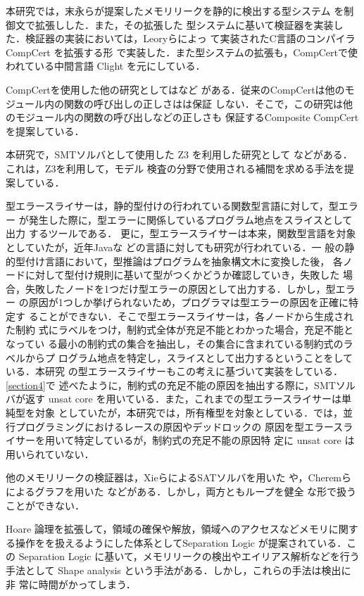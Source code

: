 本研究では，末永らが提案したメモリリークを静的に検出する型システム
\cite{DBLP:conf/aplas/SuenagaK09}を制御文で拡張しした．また，その拡張した
型システムに基いて検証器を実装した．検証器の実装においては，Leoryらによっ
て実装されたC言語のコンパイラCompCert
\cite{DBLP:journals/cacm/Leroy09,DBLP:conf/itp/KrebbersLW14 }を拡張する形
で実装した．また型システムの拡張も，CompCertで使われている中間言語
Clight \cite{DBLP:journals/jar/BlazyL09} を元にしている．

CompCertを使用した他の研究としては\cite{DBLP:conf/popl/StewartBCA15}など
がある．従来のCompCertは他のモジュール内の関数の呼び出しの正しさはは保証
しない．そこで，この研究は他のモジュール内の関数の呼び出しなどの正しさも
保証するComposite CompCertを提案している．

本研究で，SMTソルバとして使用した Z3 を利用した研究として
\cite{DBLP:conf/fmcad/McMillan11}などがある．これは，Z3を利用して，モデル
検査の分野で使用される補間を求める手法を提案している．

型エラースライサーは，静的型付けの行われている関数型言語に対して，型エラー
が発生した際に，型エラーに関係しているプログラム地点をスライスとして出力
するツールである\cite{DBLP:conf/esop/HaackW03,DBLP:conf/dsl/DineshT97}．
更に，型エラースライサーは本来，関数型言語を対象としていたが，近年Javaな
どの言語に対しても研究が行われている\cite{DBLP:conf/pepm/BoustaniH09}．一
般の静的型付け言語において，型推論はプログラムを抽象構文木に変換した後，
各ノードに対して型付け規則に基いて型がつくかどうか確認していき，失敗した
場合，失敗したノードを1つだけ型エラーの原因として出力する．しかし，型エラー
の原因が1つしか挙げられないため，プログラマは型エラーの原因を正確に特定す
ることができない．そこで型エラースライサーは，各ノードから生成された制約
式にラベルをつけ，制約式全体が充足不能とわかった場合，充足不能となってい
る最小の制約式の集合を抽出し，その集合に含まれている制約式のラベルからプ
ログラム地点を特定し，スライスとして出力するということをしている．本研究
の型エラースライサーもこの考えに基づいて実装をしている．\ref{section4}で
述べたように，制約式の充足不能の原因を抽出する際に，SMTソルバが返す
unsat core を用いている．また，これまでの型エラースライサーは単純型を対象
としていたが，本研究では，所有権型を対象としている．\cite{飯村枝里2007,
飯村枝里2008}では，並行プログラミングにおけるレースの原因やデッドロックの
原因を型エラースライサーを用いて特定しているが，制約式の充足不能の原因特
定に unsat core は用いられていない．

他のメモリリークの検証器は，XieらによるSATソルバを用いた
\cite{DBLP:conf/sigsoft/XieA05}や，Cheremらによるグラフを用いた
\cite{DBLP:conf/pldi/CheremPR07}などがある．しかし，両方ともループを健全
な形で扱うことができない．

Hoare 論理を拡張して，領域の確保や解放，領域へのアクセスなどメモリに関す
る操作をを扱えるようにした体系としてSeparation Logic
\cite{DBLP:conf/lics/Reynolds02}が提案されている．この Separation Logic
に基いて，メモリリークの検出やエイリアス解析などを行う手法として Shape
analysis
\cite{DBLP:conf/cav/BerdineCCDOWY07,DBLP:conf/tacas/DistefanoOY06,
DBLP:conf/pldi/GuoVA07} という手法がある．しかし，これらの手法は検出に非
常に時間がかってしまう．